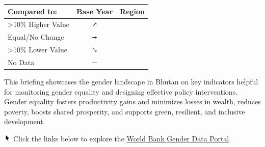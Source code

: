 \documentclass[
]{article}
\author{}
\date{\vspace{-2.5em}}
\begin{document}

\begin{table}\begingroup\fontsize{8}{10}\selectfont

\begin{tabular}[t]{lcl}

\textbf{Compared to:} & \textbf{Base Year} & \textbf{Region}\\
\midrule
>10\% Higher Value & \includegraphics[width=0.1in, height=0.1in]{upicon.png} & \cellcolor[HTML]{21908C}{}\\
Equal/No Change & \includegraphics[width=0.1in, height=0.1in]{righticon.png} & \cellcolor[HTML]{34608D}{}\\
>10\% Lower Value & \includegraphics[width=0.1in, height=0.1in]{downicon.png} & \cellcolor[HTML]{482576}{}\\
No Data & \includegraphics[width=0.1in, height=0.1in]{naicon.png} & \cellcolor{gray}{}\\

\end{tabular}
\endgroup{}\end{table}
\begin{minipage}[t][1.7cm][t]{12cm}
\fontsize{9}{8}\selectfont\raggedright
This briefing showcases the gender landscape in Bhutan on key indicators helpful for monitoring gender equality and designing effective policy interventions. Gender equality fosters productivity gains and minimizes losses in wealth, reduces poverty, boosts shared prosperity, and supports green, resilient, and inclusive development. 

\includegraphics[width=10pt]{pointer.png} Click the links below to explore the \underline{\href{https://genderdata.worldbank.org/}{World Bank Gender Data Portal}}.
\end{minipage}
\vspace{8pt}
\end{document}

